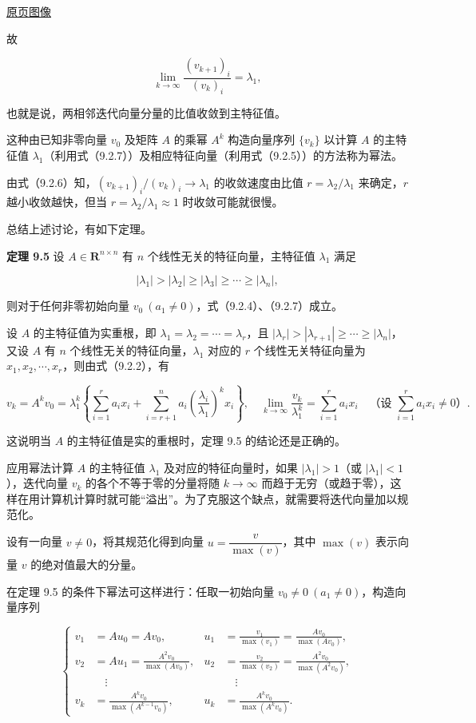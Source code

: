 \documentclass[
  10pt,
  fontset=fandol]{ctexart}
\begin{document}
\href{../../source-images/pdf-236.jpeg}{原页图像}

故

\[
\lim_{k\to\infty}\frac{(v_{k+1})_i}{(v_k)_i}=\lambda_1,
\tag{9.2.7}
\]

也就是说，两相邻迭代向量分量的比值收敛到主特征值。

这种由已知非零向量 \(v_0\) 及矩阵 \(A\) 的乘幂 \(A^k\) 构造向量序列 \(\{v_k\}\) 以计算 \(A\) 的主特征值 \(\lambda_1\)（利用式（9.2.7））及相应特征向量（利用式（9.2.5））的方法称为幂法。

由式（9.2.6）知，\((v_{k+1})_i/(v_k)_i\to\lambda_1\) 的收敛速度由比值 \(r=\lambda_2/\lambda_1\) 来确定，\(r\) 越小收敛越快，但当 \(r=\lambda_2/\lambda_1\approx1\) 时收敛可能就很慢。

总结上述讨论，有如下定理。

\textbf{定理 9.5} 设 \(A\in\mathbf R^{n\times n}\) 有 \(n\) 个线性无关的特征向量，主特征值 \(\lambda_1\) 满足

\[
|\lambda_1|>|\lambda_2|\geq|\lambda_3|\geq\cdots\geq|\lambda_n|,
\]

则对于任何非零初始向量 \(v_0\ (a_1\ne0)\)，式（9.2.4）、（9.2.7）成立。

设 \(A\) 的主特征值为实重根，即 \(\lambda_1=\lambda_2=\cdots=\lambda_r\)，且 \(|\lambda_r|>|\lambda_{r+1}|\geq\cdots\geq|\lambda_n|\)，又设 \(A\) 有 \(n\) 个线性无关的特征向量，\(\lambda_1\) 对应的 \(r\) 个线性无关特征向量为 \(x_1,x_2,\cdots,x_r\)，则由式（9.2.2），有

\[
v_k=A^kv_0=\lambda_1^k\left\{\sum_{i=1}^ra_ix_i+\sum_{i=r+1}^na_i\left(\frac{\lambda_i}{\lambda_1}\right)^kx_i\right\},\quad
\lim_{k\to\infty}\frac{v_k}{\lambda_1^k}=\sum_{i=1}^ra_ix_i\quad\text{（设 }\sum_{i=1}^ra_ix_i\ne0\text{）}.
\]

这说明当 \(A\) 的主特征值是实的重根时，定理 9.5 的结论还是正确的。

应用幂法计算 \(A\) 的主特征值 \(\lambda_1\) 及对应的特征向量时，如果 \(|\lambda_1|>1\)（或 \(|\lambda_1|<1\)），迭代向量 \(v_k\) 的各个不等于零的分量将随 \(k\to\infty\) 而趋于无穷（或趋于零），这样在用计算机计算时就可能``溢出''。为了克服这个缺点，就需要将迭代向量加以规范化。

设有一向量 \(v\ne0\)，将其规范化得到向量 \(u=\dfrac{v}{\max(v)}\)，其中 \(\max(v)\) 表示向量 \(v\) 的绝对值最大的分量。

在定理 9.5 的条件下幂法可这样进行：任取一初始向量 \(v_0\ne0\ (a_1\ne0)\)，构造向量序列

\[
\left\{
\begin{aligned}
v_1&=Au_0=Av_0,&u_1&=\frac{v_1}{\max(v_1)}=\frac{Av_0}{\max(Av_0)},\\
v_2&=Au_1=\frac{A^2v_0}{\max(Av_0)},&u_2&=\frac{v_2}{\max(v_2)}=\frac{A^2v_0}{\max(A^2v_0)},\\
&\quad\vdots&&\quad\vdots\\
v_k&=\frac{A^kv_0}{\max(A^{k-1}v_0)},&u_k&=\frac{A^kv_0}{\max(A^kv_0)}.
\end{aligned}
\right.
\]
\end{document}
